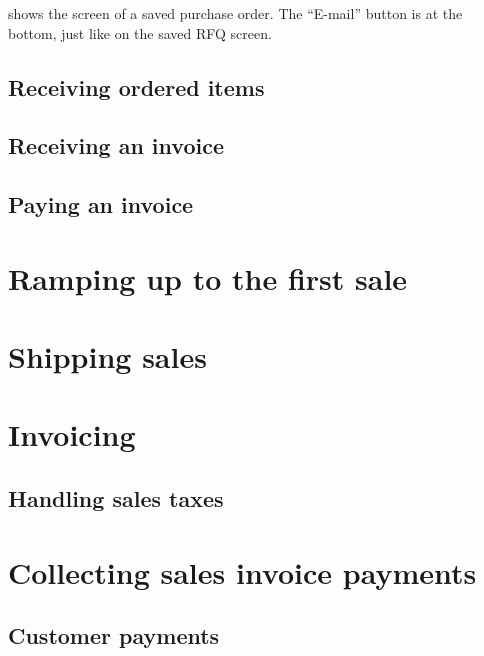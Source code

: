  shows the screen of a saved purchase order. The ``E-mail''
button is at the bottom, just like on the saved RFQ screen.

\section{Receiving ordered items}




\section{Receiving an invoice}

\section{Paying an invoice}


\chapter{Ramping up to the first sale}
\label{cha:ramping-up-to-the-first-sale}


\chapter{Shipping sales}
\label{cha:shipping-sales}

\chapter{Invoicing}
\label{cha:invoicing}

\section{Handling sales taxes}



% 


\chapter{Collecting sales invoice payments}
\label{cha:customer-payments}

\section{Customer payments}


